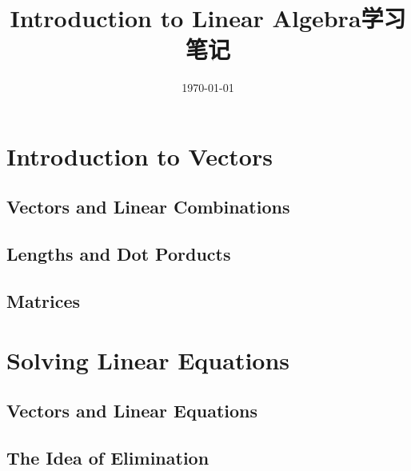 \documentclass[UTF8]{ctexart}
\title{Introduction to Linear Algebra学习笔记}
\date{\today}
\begin{document}
\maketitle

\section{Introduction to Vectors}
  \subsection{Vectors and Linear Combinations}
  \subsection{Lengths and Dot Porducts}
  \subsection{Matrices}

\section{Solving Linear Equations}
  \subsection{Vectors and Linear Equations}
  \subsection{The Idea of Elimination}
\end{document}

